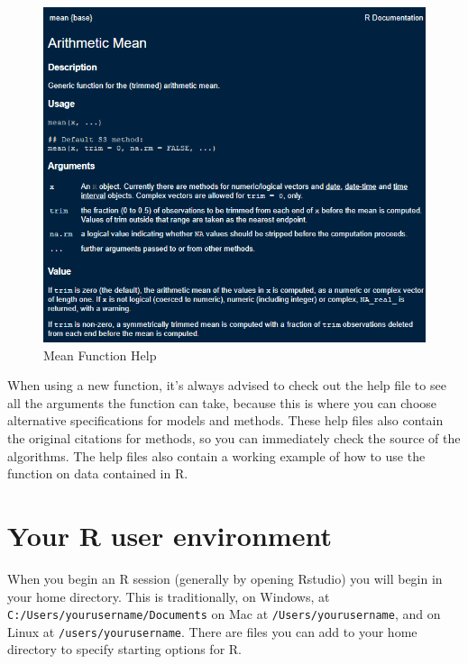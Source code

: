 \documentclass[
  letterpaper,
  DIV=11,
  numbers=noendperiod]{scrreprt}
\begin{document}
\begin{figure}

{\centering \includegraphics{images/meandoc.png}

}

\caption{Mean Function Help}

\end{figure}

When using a new function, it's always advised to check out the help
file to see all the arguments the function can take, because this is
where you can choose alternative specifications for models and methods.
These help files also contain the original citations for methods, so you
can immediately check the source of the algorithms. The help files also
contain a working example of how to use the function on data contained
in R.

\hypertarget{your-r-user-environment}{%
\section{Your R user environment}\label{your-r-user-environment}}

When you begin an R session (generally by opening Rstudio) you will
begin in your home directory. This is traditionally, on Windows, at
\texttt{\textquotesingle{}C:/Users/yourusername/Documents\textquotesingle{}}
on Mac at
\texttt{\textquotesingle{}/Users/yourusername\textquotesingle{}}, and on
Linux at
\texttt{\textquotesingle{}/users/yourusername\textquotesingle{}}. There
are files you can add to your home directory to specify starting options
for R.
\end{document}
